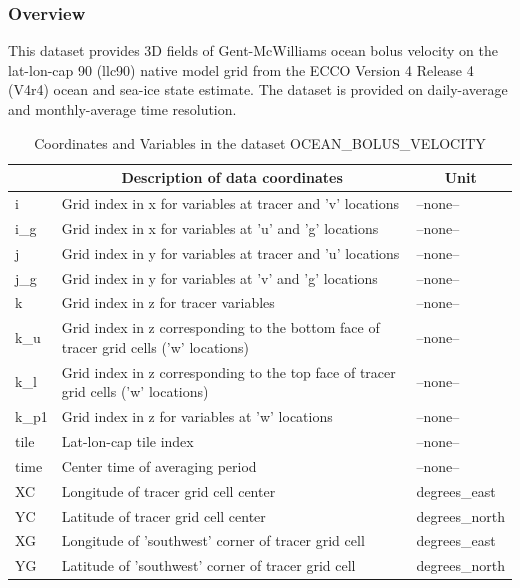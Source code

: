 \subsubsection{Overview}
This dataset provides 3D fields of Gent-McWilliams ocean bolus velocity on the lat-lon-cap 90 (llc90) native model grid from the ECCO Version 4 Release 4 (V4r4) ocean and sea-ice state estimate. The dataset is provided on daily-average and monthly-average time resolution. 
\begin{longtable}{|m{}|m{}|m{}|}
\caption{Coordinates and Variables in the dataset OCEAN\_BOLUS\_VELOCITY}
\label{tab:table-OCEAN_BOLUS_VELOCITY-fields} \\ 
\hline \endhead \hline \endfoot
\rowcolor{lightgray} \multicolumn{1}{|c|}{\textbf{Coordinates}} & \multicolumn{1}{|c|}{\textbf{Description of data coordinates}} &  \multicolumn{1}{|c|}{\textbf{Unit}}\\ \hline
i &Grid index in x for variables at tracer and 'v' locations &--none--  \\ \hline
i\_g &Grid index in x for variables at 'u' and 'g' locations &--none--  \\ \hline
j &Grid index in y for variables at tracer and 'u' locations &--none--  \\ \hline
j\_g &Grid index in y for variables at 'v' and 'g' locations &--none--  \\ \hline
k &Grid index in z for tracer variables &--none--  \\ \hline
k\_u &Grid index in z corresponding to the bottom face of tracer grid cells ('w' locations) &--none--  \\ \hline
k\_l &Grid index in z corresponding to the top face of tracer grid cells ('w' locations) &--none--  \\ \hline
k\_p1 &Grid index in z for variables at 'w' locations &--none--  \\ \hline
tile &Lat-lon-cap tile index &--none--  \\ \hline
time &Center time of averaging period &--none--  \\ \hline
XC &Longitude of tracer grid cell center &degrees\_east  \\ \hline
YC &Latitude of tracer grid cell center &degrees\_north  \\ \hline
XG &Longitude of 'southwest' corner of tracer grid cell &degrees\_east  \\ \hline
YG &Latitude of 'southwest' corner of tracer grid cell &degrees\_north  \\ \hline

\end{longtable}
